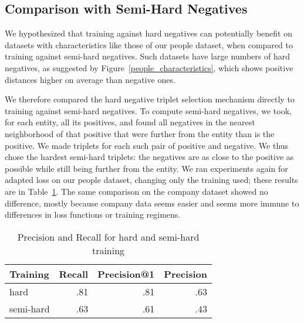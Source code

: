 \subsection{Comparison with Semi-Hard Negatives}
We hypothesized that training against hard negatives can potentially benefit on datasets with characteristics like those of our people dataset, when compared to training against semi-hard negatives.  Such datasets have large numbers of hard negatives, as suggested by Figure~\ref{people_characteristics}, which shows positive distances higher on average than negative ones.  

We therefore compared the hard negative triplet selection mechanism directly to training against semi-hard negatives.  To compute semi-hard negatives, we took, for each entity, all its positives, and found all negatives in the nearest neighborhood of that positive that were further from the entity than is the positive.  We made triplets for each such pair of positive and negative.  We thus chose the hardest semi-hard triplets: the negatives are as close to the positive as possible while still being further from the entity.  We ran experiments again for adapted loss on our people dataset, changing only the training used; these results are in Table~\ref{hard-semi-hard}.  The same comparison on the company dataset showed no difference, mostly because company data seems easier and seems more immune to differences in loss functions or training regimens.

\begin{table}[ht]
\caption{Precision and Recall for hard and semi-hard training}
\label{hard-semi-hard}
\begin{center}
\begin{tabular}{|l|r|r|r|}
\hline
Training & Recall & Precision@1 & Precision \\
\hline
hard & .81 & .81 & .63 \\
\hline
semi-hard & .63 & .61 & .43 \\
\hline
\end{tabular}%
\end{center}
\end{table}

